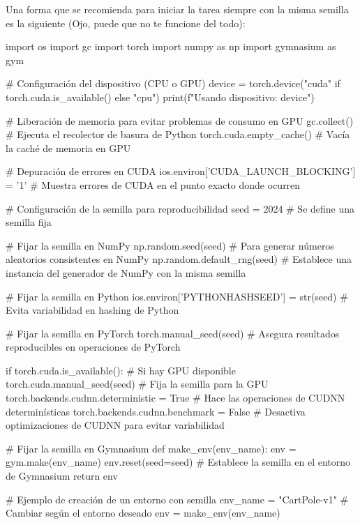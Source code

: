 \documentclass[a4paper, 11pt]{article}
\begin{document}
Una forma que se recomienda para iniciar la tarea siempre con la misma semilla es la siguiente (Ojo, puede que no te funcione del todo):


\begin{pyverbatim}[][frame=single, fontsize=\scriptsize]
import os
import gc
import torch
import numpy as np
import gymnasium as gym

# Configuración del dispositivo (CPU o GPU)
device = torch.device("cuda" if torch.cuda.is_available() else "cpu")
print(f"Usando dispositivo: {device}")

# Liberación de memoria para evitar problemas de consumo en GPU
gc.collect()  # Ejecuta el recolector de basura de Python
torch.cuda.empty_cache()  # Vacía la caché de memoria en GPU

# Depuración de errores en CUDA
ios.environ['CUDA_LAUNCH_BLOCKING'] = '1'  # Muestra errores de CUDA en el punto exacto donde ocurren

# Configuración de la semilla para reproducibilidad
seed = 2024  # Se define una semilla fija

# Fijar la semilla en NumPy
np.random.seed(seed)  # Para generar números aleatorios consistentes en NumPy
np.random.default_rng(seed)  # Establece una instancia del generador de NumPy con la misma semilla

# Fijar la semilla en Python
ios.environ['PYTHONHASHSEED'] = str(seed)  # Evita variabilidad en hashing de Python

# Fijar la semilla en PyTorch
torch.manual_seed(seed)  # Asegura resultados reproducibles en operaciones de PyTorch

if torch.cuda.is_available():  # Si hay GPU disponible
    torch.cuda.manual_seed(seed)  # Fija la semilla para la GPU
    torch.backends.cudnn.deterministic = True  # Hace las operaciones de CUDNN determinísticas
    torch.backends.cudnn.benchmark = False  # Desactiva optimizaciones de CUDNN para evitar variabilidad

# Fijar la semilla en Gymnasium
def make_env(env_name):
    env = gym.make(env_name)
    env.reset(seed=seed)  # Establece la semilla en el entorno de Gymnasium
    return env

# Ejemplo de creación de un entorno con semilla
env_name = "CartPole-v1"  # Cambiar según el entorno deseado
env = make_env(env_name)

\end{pyverbatim}
\end{document}
